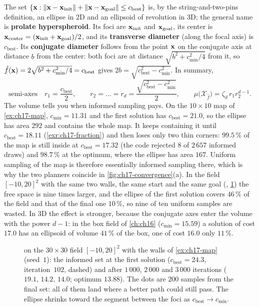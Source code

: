 The set $\left\{ \mathbf{x}:\left\lVert \mathbf{x}-\mathbf{x}_{\mathrm{init}} \right\rVert+\left\lVert \mathbf{x}-\mathbf{x}_{\mathrm{goal}} \right\rVert\le c_{\mathrm{best}} \right\}$
is, by the string-and-two-pins definition, an ellipse in 2D and an
ellipsoid of revolution in 3D; the general name is \textbf{prolate
hyperspheroid}.
Its foci are $\mathbf{x}_{\mathrm{init}}$ and $\mathbf{x}_{\mathrm{goal}}$, its center is
$\mathbf{x}_{\mathrm{center}}=(\mathbf{x}_{\mathrm{init}}+\mathbf{x}_{\mathrm{goal}})/2$, and its
\textbf{transverse diameter} (along the focal axis) is $c_{\mathrm{best}}$.
Its \textbf{conjugate diameter} follows from the point $\mathbf{x}$ on the conjugate
axis at distance $b$ from the center: both foci are at distance
$\sqrt{b^2+c_{\min}^2/4}$ from it, so $\hat f(\mathbf{x})=2\sqrt{b^2+c_{\min}^2/4}=c_{\mathrm{best}}$
gives $2b=\sqrt{c_{\mathrm{best}}^2-c_{\min}^2}$. In summary,
\begin{equation}
  \text{semi-axes}\quad r_1=\frac{c_{\mathrm{best}}}{2},\qquad
  r_2=\dots=r_d=\frac{\sqrt{c_{\mathrm{best}}^2-c_{\min}^2}}{2},\qquad
  \mu\bigl(\mathcal{X}_{\hat f}\bigr)=\zeta_d\,r_1r_2^{d-1}.
  \label{eq:ch17-axes}
\end{equation}
The volume tells you when informed sampling pays. On the $10\times10$ map
of \cref{ex:ch17-map}, $c_{\min}=11.31$ and the first solution has
$c_{\mathrm{best}}=21.0$, so the ellipse has area $292$ and contains the
whole map. It keeps containing it until $c_{\mathrm{best}}=18.11$
(\cref{exr:ch17-fraction}) and then loses only two thin corners: $99.5\,\%$
of the map is still inside at $c_{\mathrm{best}}=17.32$ (the code rejected
$8$ of $2\,657$ informed draws) and $98.7\,\%$ at the optimum, where the
ellipse has area $167$. Uniform sampling of the map is therefore
essentially informed sampling there, which is why the two planners
coincide in \cref{fig:ch17-convergence}(a). In the field $[-10,20]^2$ with
the same two walls, the same start and the same goal
(, \cref{fig:ch17-ellipses}) the free space is
nine times larger, and the ellipse of the first solution covers $46\,\%$ of
the field and that of the final one $10\,\%$, so nine of ten uniform samples
are wasted. In 3D the effect is stronger, because the conjugate axes enter
the volume with the power $d-1$: in the box field of \cref{ch:ch16}
($c_{\min}=15.59$) a solution of cost $17.0$ has an ellipsoid of volume
$41\,\%$ of the box, one of cost $16.0$ only $11\,\%$.

\begin{figure}[tb]
  \centering
  \caption{\irrtstar on the $30\times30$ field $[-10,20]^2$ with the walls
  of \cref{ex:ch17-map} (seed~$1$): the informed set at the first solution
  ($c_{\mathrm{best}}=24.3$, iteration~$102$, dashed) and after $1\,000$,
  $2\,000$ and $3\,000$ iterations ($19.1$, $14.2$, $14.0$; optimum $13.88$).
  The dots are $200$ samples from the final set: all of them land where a
  better path could still pass. The ellipse shrinks toward the segment
  between the foci as $c_{\mathrm{best}}\to c_{\min}$.}
  \label{fig:ch17-ellipses}
\end{figure}

